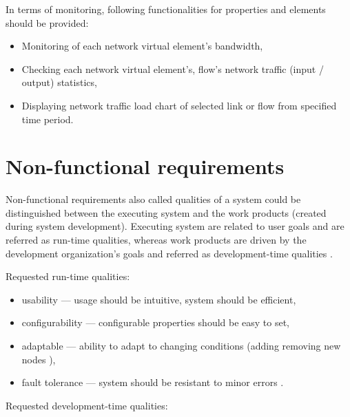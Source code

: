 \documentclass[11pt,openany]{book}
\begin{document}
        In terms of monitoring, following functionalities for properties and elements should be provided:

        \begin{itemize}
          \item Monitoring of each network virtual element's bandwidth,
          \item Checking each network virtual element's, flow's network traffic (input / output) statistics,
          \item Displaying network traffic load chart of selected link or flow from specified time period.
        \end{itemize}


    \section{Non-functional requirements}
    \label{sec:req:nonfunc}


      Non-functional requirements also called qualities of a system could be distinguished between the
      executing system and the work products (created during system development). Executing system are related to user
      goals and are referred as run-time qualities, whereas work products are driven by the development organization’s
      goals and referred as development-time qualities \cite{nonfunctional}.

      \medskip

      Requested run-time qualities:

      \begin{itemize}
        \item usability --- usage should be intuitive, system should be efficient,
        \item configurability --- configurable properties should be easy to set,
        \item adaptable --- ability to adapt to changing conditions (adding removing new nodes ),
        \item fault tolerance --- system should be resistant to minor errors .
      \end{itemize}

      \medskip

      Requested development-time qualities:
\end{document}

